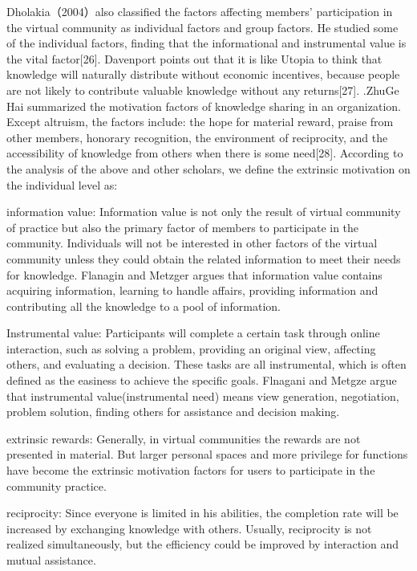 \documentclass{elsarticle}
\begin{document}
Dholakia（2004）also classified the factors affecting members’
participation in the virtual community as individual factors and group
factors. He studied some of the individual factors, finding that the
informational and instrumental value is the vital
factor[26]. Davenport points out that it is like Utopia to think that
knowledge will naturally distribute without economic incentives,
because people are not likely to contribute valuable knowledge without
any returns[27]. .ZhuGe Hai summarized the motivation factors of
knowledge sharing in an organization. Except altruism, the factors
include: the hope for material reward, praise from other members,
honorary recognition, the environment of reciprocity, and the
accessibility of knowledge from others when there is some
need[28]. According to the analysis of the above and other scholars,
we define the extrinsic motivation on the individual level as:

  information value: Information value is not only the result of
  virtual community of practice but also the primary factor of members
  to participate in the community. Individuals will not be interested
  in other factors of the virtual community unless they could obtain
  the related information to meet their needs for knowledge. Flanagin
  and Metzger argues that information value contains acquiring
  information, learning to handle affairs, providing information and
  contributing all the knowledge to a pool of information. 

Instrumental value: Participants will complete a certain task through
online interaction, such as solving a problem, providing an original
view, affecting others, and evaluating a decision. These tasks are all
instrumental, which is often defined as the easiness to achieve the
specific goals. Flnagani and Metgze argue that instrumental
value(instrumental need) means view generation, negotiation, problem
solution, finding others for assistance and decision making.

  extrinsic rewards: Generally, in virtual communities the rewards are
  not presented in material. But larger personal spaces and more
  privilege for functions have become the extrinsic motivation factors
  for users to participate in the community practice.
 
reciprocity: Since everyone is limited in his abilities, the
completion rate will be increased by exchanging knowledge with
others. Usually, reciprocity is not realized simultaneously, but the
efficiency could be improved by interaction and mutual assistance.
\end{document}
